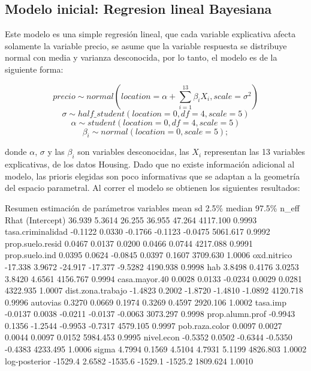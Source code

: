 \documentclass[nojss]{jss}
\begin{document}
\subsection{Modelo inicial: Regresion lineal Bayesiana} 
 
Este modelo es una simple regresión lineal, que cada variable explicativa afecta solamente la variable precio, se asume que la variable respuesta se distribuye normal con media y varianza desconocida, por lo tanto, el modelo es de la siguiente forma:

$$precio \sim normal(location = \alpha + \sum_{i=1}^{13}\beta_i X_i,scale =  \sigma^2)$$
$$\sigma \sim half\_student(location = 0,df = 4,scale = 5)$$ 
$$\alpha \sim student(location = 0,df = 4,scale = 5)$$ 
$$\beta_i \sim normal(location = 0,scale = 5);$$

donde $\alpha$, $\sigma$ y las $\beta_i$ son variables desconocidas, las $X_i$ representan las 13 variables explicativas, de los datos Housing. Dado que no existe información adicional al modelo, las prioris elegidas son poco informativas que se adaptan a la geometría del espacio parametral. Al correr el modelo se obtienen los siguientes resultados:

\begin{CodeChunk}	
\begin{CodeOutput}
 		Resumen estimación de parámetros	
   variables        mean    sd    2.5\%   median   97.5\%   n_eff    Rhat
(Intercept)        36.939 5.3614  26.255  36.955  47.264  4117.100  0.9993
tasa.criminalidad -0.1122 0.0330 -0.1766 -0.1123 -0.0475  5061.617  0.9992
prop.suelo.resid   0.0467 0.0137  0.0200  0.0466  0.0744  4217.088  0.9991
prop.suelo.ind     0.0395 0.0624 -0.0845  0.0397  0.1607  3709.630  1.0006
oxd.nitrico       -17.338 3.9672 -24.917 -17.377 -9.5282  4190.938  0.9998
hab                3.8498 0.4176  3.0253  3.8420  4.6561  4156.767  0.9994
casa.mayor.40      0.0028 0.0133 -0.0234  0.0029  0.0281  4322.935  1.0007
dist.zona.trabajo -1.4823 0.2002 -1.8720 -1.4810 -1.0892  4120.718  0.9996
autovias           0.3270 0.0669  0.1974  0.3269  0.4597  2920.106  1.0002
tasa.imp          -0.0137 0.0038 -0.0211 -0.0137 -0.0063  3073.297  0.9998
prop.alumn.prof   -0.9943 0.1356 -1.2544 -0.9953 -0.7317  4579.105  0.9997
pob.raza.color     0.0097 0.0027  0.0044  0.0097  0.0152  5984.453  0.9995
nivel.econ        -0.5352 0.0502 -0.6344 -0.5350 -0.4383  4233.495  1.0006
sigma              4.7994 0.1569  4.5104  4.7931  5.1199  4826.803  1.0002
log-posterior     -1529.4 2.6582 -1535.6 -1529.1 -1525.2  1809.624  1.0010 
\end{CodeOutput}
\end{CodeChunk}
\end{document}
